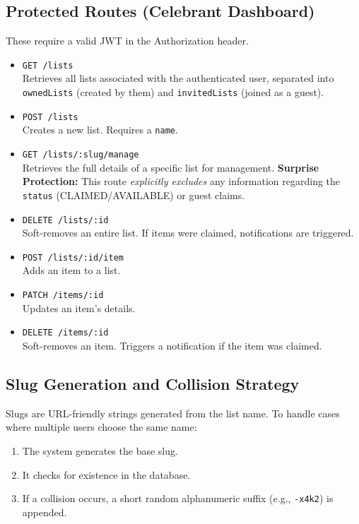 \subsection{Protected Routes (Celebrant Dashboard)}
These require a valid JWT in the Authorization header.
\begin{itemize}
    \item \texttt{GET /lists} \\
        Retrieves all lists associated with the authenticated user, separated into \texttt{ownedLists} (created by them) and \texttt{invitedLists} (joined as a guest).
    \item \texttt{POST /lists} \\
        Creates a new list. Requires a \texttt{name}.
    \item \texttt{GET /lists/:slug/manage} \\
        Retrieves the full details of a specific list for management. \textbf{Surprise Protection:} This route \textit{explicitly excludes} any information regarding the \texttt{status} (CLAIMED/AVAILABLE) or guest claims.
    \item \texttt{DELETE /lists/:id} \\
        Soft-removes an entire list. If items were claimed, notifications are triggered.
    \item \texttt{POST /lists/:id/item} \\
        Adds an item to a list.
    \item \texttt{PATCH /items/:id} \\
        Updates an item's details.
    \item \texttt{DELETE /items/:id} \\
        Soft-removes an item. Triggers a notification if the item was claimed.
\end{itemize}

\subsection{Slug Generation and Collision Strategy}
Slugs are URL-friendly strings generated from the list name.
To handle cases where multiple users choose the same name:
\begin{enumerate}
    \item The system generates the base slug.
    \item It checks for existence in the database.
    \item If a collision occurs, a short random alphanumeric suffix (e.g., \texttt{-x4k2}) is appended.
\end{enumerate}

